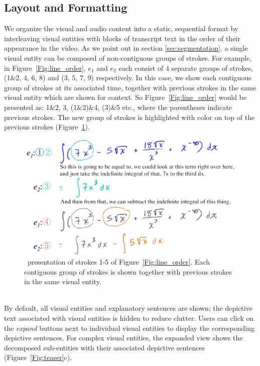 \subsection{Layout and Formatting}
\label{sec:layout}
We organize the visual and audio content into a static, sequential format by interleaving visual entities with blocks of transcript text in the order of their appearance in the video. As we point out in section \ref{sec:segmentation}, a single visual entity can be composed of non-contiguous groups of strokes. For example, in Figure~\ref{Fig:line_order}, $e_1$ and $e_2$ each consist of 4 separate groups of strokes, (1\&2, 4, 6, 8) and (3, 5, 7, 9) respectively. In this case, we show each contiguous group of strokes at its associated time, together with previous strokes in the same visual entity which are shown for context. So Figure~\ref{Fig:line_order} would be presented as: 1\&2, 3, (1\&2)\&4, (3)\&5 etc., where the parentheses indicate previous strokes. The new group of strokes is highlighted with color on top of the previous strokes (Figure~\ref{Fig:layout_line_order}). 
\begin{figure}[h!]
        \centering
        \includegraphics[width=\textwidth]{figures/layout_line_order.pdf}
        \captionsetup{font=footnotesize}
        \caption{\systemname\ presentation of strokes 1-5 of Figure~\ref{Fig:line_order}. Each contiguous group of strokes is shown together with previous strokes in the same visual entity.}
        \label{Fig:layout_line_order}
\end{figure}\\

By default, all visual entities and explanatory sentences are shown; the depictive text associated with visual entities is hidden to reduce clutter. Users can click on the \emph{expand} buttons next to individual visual entities to display the corresponding depictive sentences. For complex visual entities, the expanded view shows the decomposed sub-entities with their associated depictive sentences (Figure~\ref{Fig:teaser}c).\\

